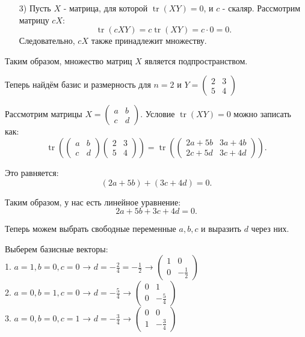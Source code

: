 \documentclass[a4paper]{article}
\begin{document}
\begin{enumerate}
\begin{enumerate}
        \item[3)]
        Пусть $ X $ - матрица, для которой $ \operatorname{tr}(X Y) = 0 $, и $ c $ - скаляр. Рассмотрим матрицу $ cX $:
        $$
        \operatorname{tr}(cX Y) = c \operatorname{tr}(X Y) = c \cdot 0 = 0.
        $$
        Следовательно, $ cX $ также принадлежит множеству.\\
    \end{enumerate}
    
    
    Таким образом, множество матриц $ X $ является подпространством.

    Теперь найдём базис и размерность для $ n=2 $ и $ Y=\begin{pmatrix} 2 & 3 \\ 5 & 4 \end{pmatrix} $
    
    Рассмотрим матрицы $ X = \begin{pmatrix} a & b \\ c & d \end{pmatrix} $. Условие $ \operatorname{tr}(X Y) = 0 $ можно записать как:
    $$
    \operatorname{tr}\left(\begin{pmatrix} a & b \\ c & d \end{pmatrix} \begin{pmatrix} 2 & 3 \\ 5 & 4 \end{pmatrix}\right) = \operatorname{tr}\left(\begin{pmatrix} 2a + 5b & 3a + 4b \\ 2c + 5d & 3c + 4d \end{pmatrix}\right).
    $$

    Это равняется:
    $$
    (2a + 5b) + (3c + 4d) = 0.
    $$

    Таким образом, у нас есть линейное уравнение:
    $$
    2a + 5b + 3c + 4d = 0.
    $$

    Теперь можем выбрать свободные переменные $ a, b, c $ и выразить $ d $ через них. 

    Выберем базисные векторы:\\
    1. $ a = 1, b = 0, c = 0 $ → $ d = -\frac{2}{4} = -\frac{1}{2} $ → $ \begin{pmatrix} 1 & 0 \\ 0 & -\frac{1}{2} \end{pmatrix} $\\
    2. $ a = 0, b = 1, c = 0 $ → $ d = -\frac{5}{4} $ → $ \begin{pmatrix} 0 & 1 \\ 0 & -\frac{5}{4} \end{pmatrix} $\\
    3. $ a = 0, b = 0, c = 1 $ → $ d = -\frac{3}{4} $ → $ \begin{pmatrix} 0 & 0 \\ 1 & -\frac{3}{4} \end{pmatrix} $


\end{enumerate}
\end{document}

